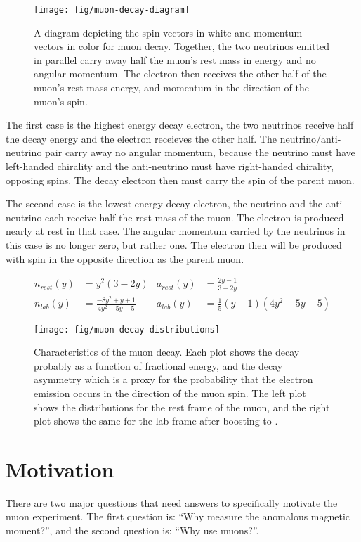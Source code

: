 \begin{figure}
\label{fig:muon-decay-diagram}
\centering
\texttt{[image: fig/muon-decay-diagram]}
\caption{A diagram depicting the spin vectors in white and momentum vectors in color for muon decay. Together, the two neutrinos emitted in parallel carry away half the muon's rest mass in energy and no angular momentum.  The electron then receives the other half of the muon's rest mass energy, and momentum in the direction of the muon's spin.}
\end{figure}

The first case is the highest energy decay electron, the two neutrinos receive half the decay energy and the electron receieves the other half.  The neutrino/anti-neutrino pair carry away no angular momentum, because the neutrino must have left-handed chirality and the anti-neutrino must have right-handed chirality, opposing spins.  The decay electron then must carry the spin of the parent muon.

The second case is the lowest energy decay electron, the neutrino and the anti-neutrino each receive half the rest mass of the muon.  The electron is produced nearly at rest in that case.  The angular momentum carried by the neutrinos in this case is no longer zero, but rather one.  The electron then will be produced with spin in the opposite direction as the parent muon.

\begin{align}
\label{eqn:muon-decay-distributions}
n_{rest}(y) & = y^2(3 - 2 y) & a_{rest}(y) & = \frac{2 y - 1}{3 - 2y} \\
n_{lab}(y) & = \frac{-8 y^2 + y + 1}{4 y^2 - 5y - 5} & a_{lab}(y) & = \tfrac{1}{5}(y - 1) (4 y^2 - 5y - 5)
\end{align}

\begin{figure}
\label{fig:muon-decay-distributions}
\centering
\texttt{[image: fig/muon-decay-distributions]}
\caption{Characteristics of the muon decay.  Each plot shows the decay probably as a function of fractional energy, and the decay asymmetry which is a proxy for the probability that the electron emission occurs in the direction of the muon spin.  The left plot shows the distributions for the rest frame of the muon, and the right plot shows the same for the lab frame after boosting to \pmagic.}
\end{figure}

\section{Motivation}
There are two major questions that need answers to specifically motivate the muon \gmtwo experiment.  The first question is: ``Why measure the anomalous magnetic moment?'', and the second question is: ``Why use muons?''.

